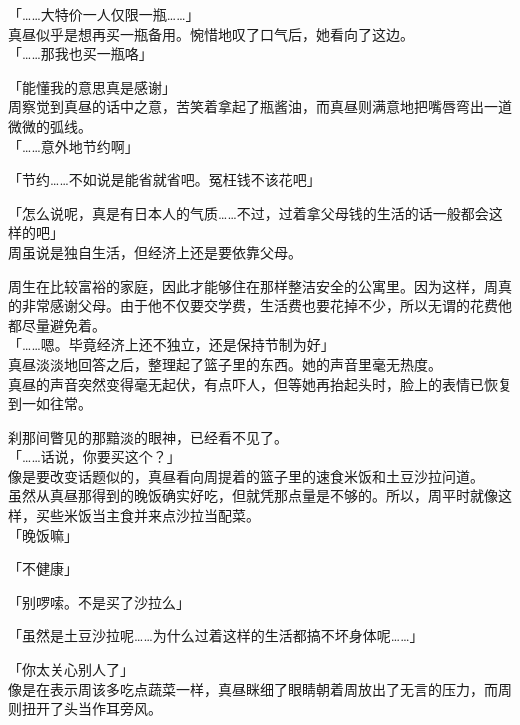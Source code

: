 「……大特价一人仅限一瓶……」\\

真昼似乎是想再买一瓶备用。惋惜地叹了口气后，她看向了这边。\\

「……那我也买一瓶咯」

「能懂我的意思真是感谢」\\

周察觉到真昼的话中之意，苦笑着拿起了瓶酱油，而真昼则满意地把嘴唇弯出一道微微的弧线。\\

「……意外地节约啊」

「节约……不如说是能省就省吧。冤枉钱不该花吧」

「怎么说呢，真是有日本人的气质……不过，过着拿父母钱的生活的话一般都会这样的吧」\\

周虽说是独自生活，但经济上还是要依靠父母。

周生在比较富裕的家庭，因此才能够住在那样整洁安全的公寓里。因为这样，周真的非常感谢父母。由于他不仅要交学费，生活费也要花掉不少，所以无谓的花费他都尽量避免着。\\

「……嗯。毕竟经济上还不独立，还是保持节制为好」\\

真昼淡淡地回答之后，整理起了篮子里的东西。她的声音里毫无热度。\\

真昼的声音突然变得毫无起伏，有点吓人，但等她再抬起头时，脸上的表情已恢复到一如往常。

刹那间瞥见的那黯淡的眼神，已经看不见了。\\

「……话说，你要买这个？」\\

像是要改变话题似的，真昼看向周提着的篮子里的速食米饭和土豆沙拉问道。\\

虽然从真昼那得到的晚饭确实好吃，但就凭那点量是不够的。所以，周平时就像这样，买些米饭当主食并来点沙拉当配菜。\\

「晚饭嘛」

「不健康」

「别啰嗦。不是买了沙拉么」

「虽然是土豆沙拉呢……为什么过着这样的生活都搞不坏身体呢……」

「你太关心别人了」\\

像是在表示周该多吃点蔬菜一样，真昼眯细了眼睛朝着周放出了无言的压力，而周则扭开了头当作耳旁风。\\

